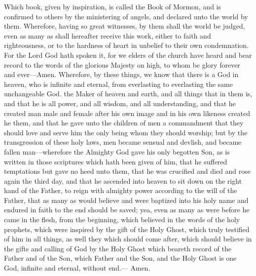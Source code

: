 				Which book, given by inspiration, is called the Book of Mormon, and is confirmed to others by the ministering of angels, and declared unto the world by them. Wherefore, having so great witnesses, by them shall the world be judged, even as many as shall hereafter receive this work, either to faith and righteousness, or to the hardness of heart in unbelief to their own condemnation. For the Lord God hath spoken it, for we elders of the church have heard and bear record to the words of the glorious Majesty on high, to whom be glory forever and ever---Amen. Wherefore, by these things, we know that there is a God in heaven, who is infinite and eternal, from everlasting to everlasting the same unchangeable God. the Maker of heaven and earth, and all things that in them is, and that he is all power, and all wisdom, and all understanding, and that he created man male and female after his own image and in his own likeness created he them, and that he gave unto the children of men a commandment that they should love and serve him the only being whom they should worship; but by the transgression of these holy laws, men became sensual and devlish, and became fallen man---wherefore the Almighty God gave his only begotten Son, as is written in those scriptures which hath been given of him, that he suffered temptations but gave no heed unto them, that he was crucified and died and rose again the third day, and that he ascended into heaven to sit down on the right hand of the Father, to reign with almighty power according to the will of the Father, that as many as would believe and were baptized into his holy name and endured in faith to the end should be saved; yea, even as many as were before he came in the flesh, from the beginning, which believed in the words of the holy prophets, which were inspired by the gift of the Holy Ghost, which truly testified of him in all things, as well they which should come after, which should believe in the gifts and calling of God by the Holy Ghost which beareth record of the Father and of the Son, which Father and the Son, and the Holy Ghost is one God, infinite and eternal, without end.--- Amen.

